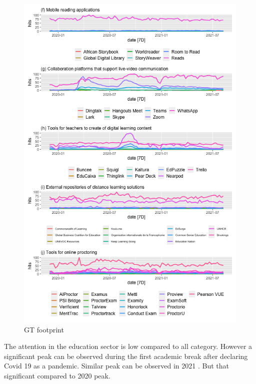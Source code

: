 \documentclass[11pt,a4paper,]{article}
\begin{document}
\begin{figure}[h]

{\centering \includegraphics[width=1\textwidth]{figure/plot2-1} 

}

\caption{GT footprint}\label{fig:plot2}
\end{figure}

The attention in the education sector is low compared to all category. However a significant peak can be observed during the first academic break after declaring Covid 19 as a pandemic. Similar peak can be observed in 2021 . But that significant compared to 2020 peak.
\end{document}
